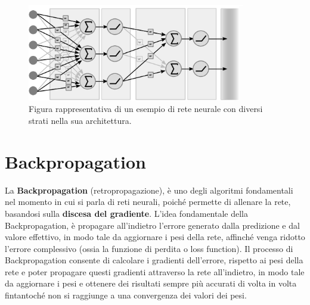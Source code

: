 \begin{figure}[h]
    \centering
    \includegraphics[width=0.85\textwidth]{figure/NeuralNet.png}
    \caption{Figura rappresentativa di un esempio di rete neurale con diversi strati nella sua architettura.}
    \label{fig:neuralNet}
\end{figure}

\section{Backpropagation}
La \textbf{Backpropagation} (retropropagazione), è uno degli algoritmi fondamentali nel momento in cui si parla di reti neurali, poiché permette di allenare la rete, basandosi sulla \textbf{discesa del gradiente}. L'idea fondamentale della Backpropagation, è propagare all'indietro l'errore generato dalla predizione e dal valore effettivo, in modo tale da aggiornare i pesi della rete, affinché venga ridotto l'errore complessivo (ossia la funzione di perdita o loss function). Il processo di Backpropagation consente di calcolare i gradienti dell'errore, rispetto ai pesi della rete e poter propagare questi gradienti attraverso la rete all'indietro, in modo tale da aggiornare i pesi e ottenere dei risultati sempre più accurati di volta in volta fintantoché non si raggiunge a una convergenza dei valori dei pesi.

